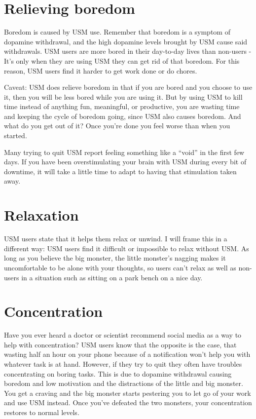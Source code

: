 \documentclass[
]{book}
\begin{document}
\section{Relieving boredom}\label{relieving-boredom}

Boredom is caused by USM use. Remember that boredom is a symptom of dopamine withdrawal, and the high dopamine levels brought by USM cause said withdrawals. USM users are more bored in their day-to-day lives than non-users - It's only when they are using USM they can get rid of that boredom. For this reason, USM users find it harder to get work done or do chores.

Caveat: USM does relieve boredom in that if you are bored and you choose to use it, then you will be less bored while you are using it. But by using USM to kill time instead of anything fun, meaningful, or productive, you are wasting time and keeping the cycle of boredom going, since USM also causes boredom. And what do you get out of it? Once you're done you feel worse than when you started.

Many trying to quit USM report feeling something like a ``void'' in the first few days. If you have been overstimulating your brain with USM during every bit of downtime, it will take a little time to adapt to having that stimulation taken away.

\section{Relaxation}\label{relaxation}

USM users state that it helps them relax or unwind. I will frame this in a different way: USM users find it difficult or impossible to relax without USM. As long as you believe the big monster, the little monster's nagging makes it uncomfortable to be alone with your thoughts, so users can't relax as well as non-users in a situation such as sitting on a park bench on a nice day.

\section{Concentration}\label{concentration}

Have you ever heard a doctor or scientist recommend social media as a way to help with concentration? USM users know that the opposite is the case, that wasting half an hour on your phone because of a notification won't help you with whatever task is at hand. However, if they try to quit they often have troubles concentrating on boring tasks. This is due to dopamine withdrawal causing boredom and low motivation and the distractions of the little and big monster. You get a craving and the big monster starts pestering you to let go of your work and use USM instead. Once you've defeated the two monsters, your concentration restores to normal levels.
\end{document}
